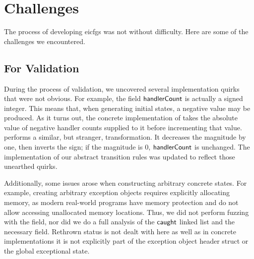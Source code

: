 
\section{Challenges}
The process of developing \glspl{eicfg} was not without difficulty.
Here are some of the challenges we encountered.

\subsection{For Validation}
During the process of validation, we uncovered several implementation quirks that were not obvious.
For example, the field $\mathsf{handlerCount}$ is actually a signed integer.
This means that, when generating initial states, a negative value may be produced.
As it turns out, the concrete implementation of  takes the absolute value of negative handler counts supplied to it before incrementing that value.
 performs a similar, but stranger, transformation.
It decreases the magnitude by one, then inverts the sign; if the magnitude is 0, $\mathsf{handlerCount}$ is unchanged.
The implementation of our abstract transition rules was updated to reflect those unearthed quirks.

Additionally, some issues arose when constructing arbitrary concrete states.
For example, creating arbitrary exception objects requires explicitly allocating memory, as modern real-world programs have memory protection and do not allow accessing unallocated memory locations.
Thus, we did not perform fuzzing with the  field, nor did we do a full analysis of the $\mathsf{caught}$ linked list and the necessary  field.
Rethrown status is not dealt with here as well as in concrete implementations it is not explicitly part of the exception object header struct or the global exceptional state.

